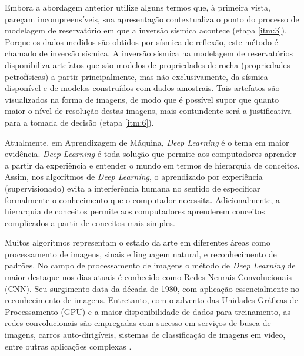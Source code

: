 Embora a abordagem anterior utilize alguns termos que, à primeira vista, pareçam incompreensíveis,
sua apresentação contextualiza o ponto do processo de modelagem de
reservatório em que a inversão sísmica acontece (etapa \ref{itm:3}).
Porque os dados medidos são obtidos por sísmica de reflexão,
este método é chamado de inversão sísmica. A inversão sísmica na
modelagem de reservatórios disponibiliza artefatos que são modelos de propriedades de rocha
(propriedades petrofísicas) a partir principalmente, mas não exclusivamente,
da sísmica disponível e de modelos construídos com dados amostrais. Tais artefatos
são visualizados na forma de imagens, de modo que é possível supor que quanto maior
o nível de resolução destas imagens, mais contundente será a justificativa para a tomada de decisão
(etapa \ref{itm:6}).

Atualmente, em Aprendizagem de Máquina, \textit{Deep Learning} é o tema em
maior evidência. \textit{Deep Learning} é toda solução que permite aos
computadores aprender a partir da experiência e entender o mundo em
termos de hierarquia de conceitos.
Assim, nos algoritmos de \textit{Deep Learning}, o aprendizado
por experiência (supervisionado) evita a interferência
humana no sentido de especificar formalmente o conhecimento que o computador necessita.
Adicionalmente, a hierarquia de conceitos permite aos computadores aprenderem
conceitos complicados a partir de conceitos mais simples\cite{Gdfl16}.

Muitos algoritmos representam
o estado da arte em diferentes áreas como processamento de imagens, 
sinais e linguagem natural, e reconhecimento de padrões. No campo de
processamento de imagens o método de \textit{Deep Learning} de
maior destaque nos dias atuais é conhecido
como Redes Neurais Convolucionais (CNN). Seu surgimento
data da década de 1980, com aplicação essencialmente no reconhecimento de imagens.
Entretanto, com o advento das Unidades Gráficas de Processamento (GPU) e a maior
disponibilidade de dados para treinamento, as redes convolucionais
são empregadas com sucesso em serviços de busca de imagens, carros auto-dirigíveis,
sistemas de classificação de imagens em video, entre outras aplicações complexas \cite[p. 50]{Buduma15}.

